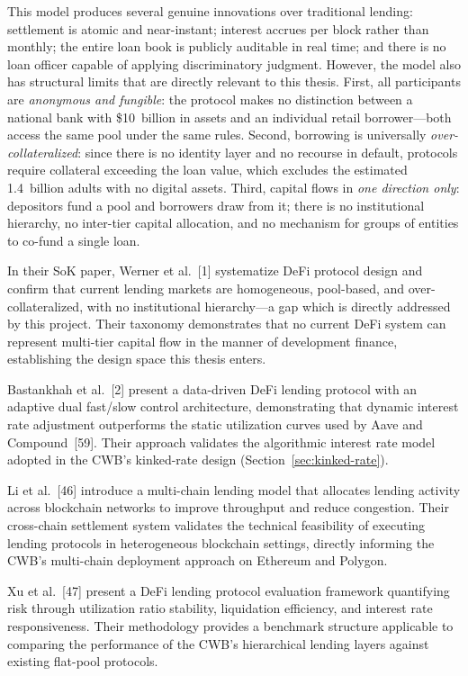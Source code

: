 \documentclass[12pt,a4paper]{report}
\begin{document}
This model produces several genuine innovations over traditional lending: settlement is atomic and near-instant; interest accrues per block rather than monthly; the entire loan book is publicly auditable in real time; and there is no loan officer capable of applying discriminatory judgment. However, the model also has structural limits that are directly relevant to this thesis. First, all participants are \textit{anonymous and fungible}: the protocol makes no distinction between a national bank with \$10~billion in assets and an individual retail borrower---both access the same pool under the same rules. Second, borrowing is universally \textit{over-collateralized}: since there is no identity layer and no recourse in default, protocols require collateral exceeding the loan value, which excludes the estimated 1.4~billion adults with no digital assets. Third, capital flows in \textit{one direction only}: depositors fund a pool and borrowers draw from it; there is no institutional hierarchy, no inter-tier capital allocation, and no mechanism for groups of entities to co-fund a single loan.

In their SoK paper, Werner et al.~[1] systematize DeFi protocol design and confirm that current lending markets are homogeneous, pool-based, and over-collateralized, with no institutional hierarchy---a gap which is directly addressed by this project. Their taxonomy demonstrates that no current DeFi system can represent multi-tier capital flow in the manner of development finance, establishing the design space this thesis enters.

Bastankhah et al.~[2] present a data-driven DeFi lending protocol with an adaptive dual fast/slow control architecture, demonstrating that dynamic interest rate adjustment outperforms the static utilization curves used by Aave and Compound~[59]. Their approach validates the algorithmic interest rate model adopted in the CWB's kinked-rate design (Section~\ref{sec:kinked-rate}).

Li et al.~[46] introduce a multi-chain lending model that allocates lending activity across blockchain networks to improve throughput and reduce congestion. Their cross-chain settlement system validates the technical feasibility of executing lending protocols in heterogeneous blockchain settings, directly informing the CWB's multi-chain deployment approach on Ethereum and Polygon.

Xu et al.~[47] present a DeFi lending protocol evaluation framework quantifying risk through utilization ratio stability, liquidation efficiency, and interest rate responsiveness. Their methodology provides a benchmark structure applicable to comparing the performance of the CWB's hierarchical lending layers against existing flat-pool protocols.
\end{document}
